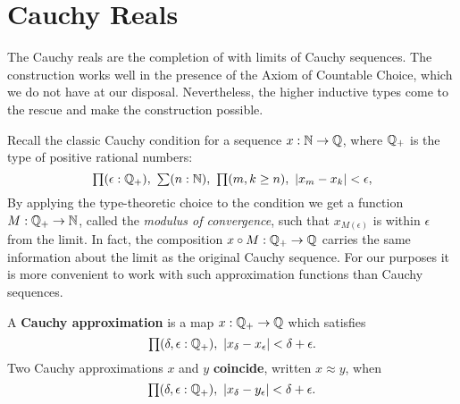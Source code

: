 \section{Cauchy Reals}
\label{sec:cauchy-reals}

The Cauchy reals are the completion of \Q with limits of Cauchy sequences. The
construction works well in the presence of the Axiom of Countable Choice, which we do not
have at our disposal. Nevertheless, the higher inductive types come to the rescue and make
the construction possible.

Recall the classic Cauchy condition for a sequence $x : \mathbb{N} \to \mathbb{Q}$, where $\mathbb{Q}_{+}$ is the
type of positive rational numbers:
%
\[ \prd{\epsilon : \Qp} \sm{n : \N} \prd{m, k \geq n} |x_m - x_k| < \epsilon, \]
%
By applying the type-theoretic choice to the condition we get a function $M : \mathbb{Q}_{+} \to \mathbb{N}$,
called the \emph{modulus of convergence}, such that $x_{M(\epsilon)}$ is within $\epsilon$
from the limit. In fact, the composition $x \circ M : \mathbb{Q}_{+} \to \mathbb{Q}$ carries the same
information about the limit as the original Cauchy sequence. For our purposes it is more
convenient to work with such approximation functions than Cauchy sequences.

\begin{defn}\label{defn:cauchy-approximation}
  A \textbf{Cauchy approximation} is a map $x : \mathbb{Q}_{+} \to \mathbb{Q}$ which satisfies
  \begin{equation}
    \label{eq:cauchy-approx}
    \prd{\delta, \epsilon :\Qp} |x_\delta - x_\epsilon| < \delta + \epsilon.
  \end{equation}
  Two Cauchy approximations $x$ and $y$ \textbf{coincide}, written $x \approx y$, when
  \begin{equation}
    \label{eq:cauchy-coincide}
    \prd{\delta, \epsilon:\Qp} |x_\delta - y_\epsilon| < \delta + \epsilon.
  \end{equation}
\end{defn}


